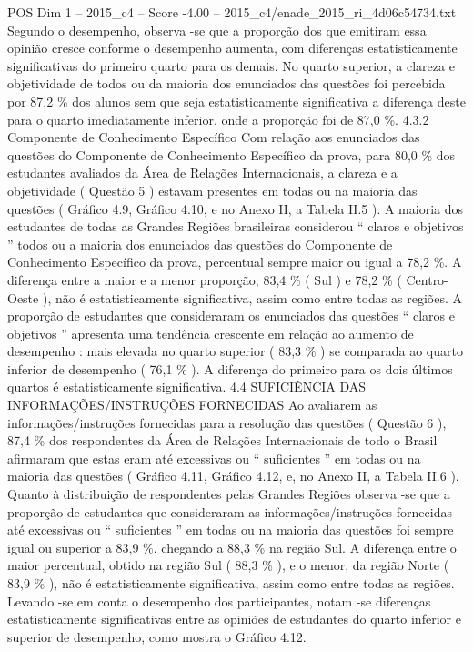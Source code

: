 \begin{textsample}{POS Dim 1 – 2015\_c4 – Score -4.00 – 2015\_c4/enade\_2015\_ri\_4d06c54734.txt}
Segundo o desempenho, observa -se que a proporção dos que emitiram essa opinião cresce conforme o desempenho aumenta, com diferenças estatisticamente significativas do primeiro quarto para os demais.
No quarto superior, a clareza e objetividade de todos ou da maioria dos enunciados das questões foi percebida por 87,2 \% dos alunos sem que seja estatisticamente significativa a diferença deste para o quarto imediatamente inferior, onde a proporção foi de 87,0 \%. 4.3.2 Componente de Conhecimento Específico Com relação aos enunciados das questões do Componente de Conhecimento Específico da prova, para 80,0 \% dos estudantes avaliados da Área de Relações Internacionais, a clareza e a objetividade ( Questão 5 ) estavam presentes em todas ou na maioria das questões ( Gráfico 4.9, Gráfico 4.10, e no Anexo II, a Tabela II.5 ).
A maioria dos estudantes de todas as Grandes Regiões brasileiras considerou “ claros e objetivos ” todos ou a maioria dos enunciados das questões do Componente de Conhecimento Específico da prova, percentual sempre maior ou igual a 78,2 \%.
A diferença entre a maior e a menor proporção, 83,4 \% ( Sul ) e 78,2 \% ( Centro-Oeste ), não é estatisticamente significativa, assim como entre todas as regiões.
A proporção de estudantes que consideraram os enunciados das questões “ claros e objetivos ” apresenta uma tendência crescente em relação ao aumento de desempenho : mais elevada no quarto superior ( 83,3 \% ) se comparada ao quarto inferior de desempenho ( 76,1 \% ).
A diferença do primeiro para os dois últimos quartos é estatisticamente significativa. 4.4 SUFICIÊNCIA DAS INFORMAÇÕES/INSTRUÇÕES FORNECIDAS Ao avaliarem as informações/instruções fornecidas para a resolução das questões ( Questão 6 ), 87,4 \% dos respondentes da Área de Relações Internacionais de todo o Brasil afirmaram que estas eram até excessivas ou “ suficientes ” em todas ou na maioria das questões ( Gráfico 4.11, Gráfico 4.12, e, no Anexo II, a Tabela II.6 ).
Quanto à distribuição de respondentes pelas Grandes Regiões observa -se que a proporção de estudantes que consideraram as informações/instruções fornecidas até excessivas ou “ suficientes ” em todas ou na maioria das questões foi sempre igual ou superior a 83,9 \%, chegando a 88,3 \% na região Sul.
A diferença entre o maior percentual, obtido na região Sul ( 88,3 \% ), e o menor, da região Norte ( 83,9 \% ), não é estatisticamente significativa, assim como entre todas as regiões.
Levando -se em conta o desempenho dos participantes, notam -se diferenças estatisticamente significativas entre as opiniões de estudantes do quarto inferior e superior de desempenho, como mostra o Gráfico 4.12.

\end{textsample}

